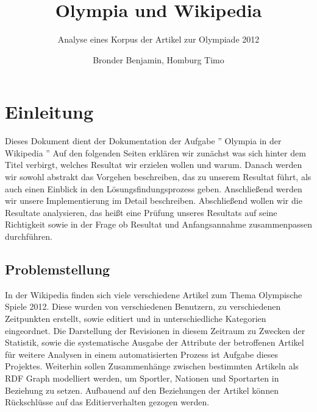\documentclass[pagesize=auto, titlepage=on]{scrartcl}
\begin{document}
\titlehead{Texttechnologie II \hfill Goethe-Universtität Frankfurt am Main}
\subject{Olympia und Wikipedia}
\author{Bronder Benjamin, Homburg Timo}
\title{Olympia und Wikipedia}
\subtitle{Analyse eines Korpus der Artikel zur Olympiade 2012}
\publishers{}

\maketitle

\tableofcontents

\section{Einleitung}
\label{sec:einleitung}
Dieses Dokument dient der Dokumentation der Aufgabe '' Olympia in der Wikipedia ''
Auf den folgenden Seiten  erklären wir zunächst was sich hinter dem Titel verbirgt, welches Resultat wir erzielen wollen und warum.
Danach werden wir sowohl abstrakt das Vorgehen beschreiben, das zu unserem Resultat führt, als auch einen Einblick in den Lösungsfindungsprozess geben. Anschließend werden wir unsere Implementierung im Detail beschreiben.
Abschließend wollen wir die Resultate analysieren, das heißt eine Prüfung unseres Resultats auf seine Richtigkeit sowie in der Frage ob Resultat und Anfangsannahme zusammenpassen durchführen.


\subsection{Problemstellung}
\label{sec:problemstellung}
In der Wikipedia finden sich viele verschiedene Artikel zum Thema Olympische Spiele 2012. Diese wurden von verschiedenen Benutzern, zu verschiedenen Zeitpunkten erstellt, sowie editiert und in unterschiedliche Kategorien eingeordnet. Die Darstellung der Revisionen in diesem Zeitraum zu Zwecken der Statistik, sowie die systematische Ausgabe der Attribute der betroffenen Artikel für weitere Analysen in einem automatisierten Prozess ist Aufgabe dieses Projektes. Weiterhin sollen Zusammenhänge zwischen bestimmten Artikeln als RDF Graph modelliert werden, um Sportler, Nationen und Sportarten in Beziehung zu setzen. Aufbauend auf den Beziehungen der Artikel können Rückschlüsse auf das Editierverhalten gezogen werden.
\end{document}

